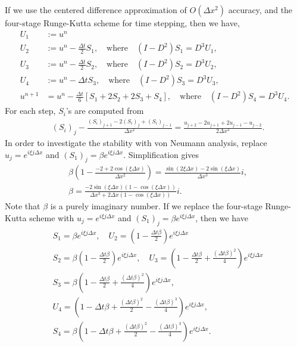 \documentclass[review]{elsarticle}
\begin{document}
If we use the centered difference approximation of $O(\Delta x^2)$
accuracy, and the four-stage Runge-Kutta scheme for time stepping,
then we have,
\begin{align*}
U_1 &:= u^n \\
U_2 &:= u^n - \frac{\Delta t}{2}S_1, \quad  \textrm{where}\quad 
(I-D^2)S_1 = D^3 U_1, \\
U_3 &:= u^n - \frac{\Delta t}{2}S_2, \quad  \textrm{where}\quad
(I-D^2)S_2 = D^3 U_2, \\
U_4 &:= u^n - \Delta tS_3, \quad  \textrm{where}\quad
(I-D^2)S_3 = D^3 U_3, \\
u^{n+1} & = u^n -\frac{\Delta t}{6} \left[
S_1 + 2S_2 + 2S_3 + S_4
\right],  \quad  \textrm{where}\quad
(I-D^2)S_4 = D^3 U_4.
\end{align*}
For each step, $S_i$'s are computed from
\begin{align*}
& (S_i)_j - \frac{(S_i)_{j+1}-2(S_i)_j+(S_i)_{j-1}}{\Delta x^2} = 
\frac{u_{j+2} - 2u_{j+1} +2u_{j-1} -u_{j-2}}{2\Delta x^3}.
\end{align*}
In order to investigate the stability with von Neumann analysis,
replace $u_j= e^{i\xi j \Delta x}$ and  $(S_1)_j= \beta e^{i\xi j \Delta x}$. 
Simplification gives
\begin{align*}
&\beta \left( 1 - \frac{-2+2\cos(\xi \Delta x) }{\Delta x^2} \right) = 
\frac{\sin(2\xi \Delta x) - 2 \sin(\xi \Delta x)}{\Delta x^3} i, \\
& \beta = \frac{ -2\sin(\xi \Delta x)(1-  \cos(\xi \Delta x)) }
                     { \Delta x^3 +2\Delta x(1-\cos(\xi \Delta x))} i.
\end{align*}
Note that $\beta$ is a purely imaginary number.
If we replace the four-stage Runge-Kutta scheme with
$u_j= e^{i\xi j \Delta x}$ and  $(S_1)_j= \beta e^{i\xi j \Delta x}$, then we have
\begin{align*}
&S_1 = \beta e^{i\xi j \Delta x} ,
 \quad U_2 = \left(1-\frac{\Delta t\beta}{2} \right) e^{i\xi j \Delta x}\\
&S_2 = \beta \left(1-\frac{\Delta t\beta}{2} \right) e^{i\xi j \Delta x} ,
 \quad U_3 = \left(1- \frac{\Delta t\beta}{2}+\frac{(\Delta t\beta)^2}{4} \right) e^{i\xi j \Delta x}\\
&S_3 =  \beta\left(1- \frac{\Delta t\beta}{2}+\frac{(\Delta t\beta)^2}{4} \right)  e^{i\xi j \Delta x} , \\
& U_4 = \left(1-\Delta t\beta
+ \frac{(\Delta t\beta)^2}{2}-\frac{(\Delta t\beta)^3}{4} \right) e^{i\xi j \Delta x},\\
&S_4 = \beta \left(1-\Delta t\beta
+ \frac{(\Delta t\beta)^2}{2}-\frac{(\Delta t\beta)^3}{4} \right) e^{i\xi j \Delta x}.
\end{align*}
\end{document}
